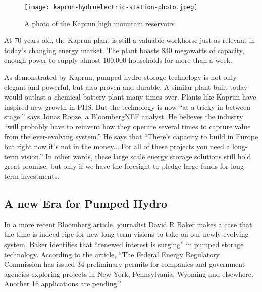 \documentclass[hidelinks,12pt,a4paper]{article}
\begin{document}

\begin{figure}[ht!]
    \centering
    \texttt{[image: kaprun-hydroelectric-station-photo.jpeg]}
    \caption{A photo of the Kaprun high mountain reservoirs \cite{MostBeautifulBattery}}
\end{figure}
\FloatBarrier

At 70 years old, the Kaprun plant is still a valuable workhorse just as relevant in today's changing energy market. The plant boasts 830 megawatts of capacity, enough power to supply almost 100,000 households for more than a week. \cite{MostBeautifulBattery}

As demonstrated by Kaprun, pumped hydro storage technology is not only elegant and powerful, but also proven and durable. A similar plant built today would outlast a chemical battery plant many times over. Plants like Kaprun have inspired new growth in PHS. But the technology is now “at a tricky in-between stage,” says Jonas Rooze, a BloombergNEF analyst. \cite{MostBeautifulBattery} He believes the industry “will probably have to reinvent how they operate several times to capture value from the ever-evolving system.” \cite{MostBeautifulBattery} He says that “There’s capacity to build in Europe but right now it’s not in the money....For all of these projects you need a long-term vision.” \cite{MostBeautifulBattery} In other words, these large scale energy storage solutions still hold great promise, but only if we have the foresight to pledge large funds for long-term investments.

\subsection{A new Era for Pumped Hydro}
In a more recent Bloomberg article, journalist David R Baker makes a case that the time is indeed ripe for new long term visions to take on our newly evolving system. Baker identifies that “renewed interest is surging” in pumped storage technology. \cite{QuestforBiggerBatteries} According to the article, “The Federal Energy Regulatory Commission has issued 34 preliminary permits for companies and government agencies exploring projects in New York, Pennsylvania, Wyoming and elsewhere. Another 16 applications are pending.” \cite{QuestforBiggerBatteries}
\end{document}
